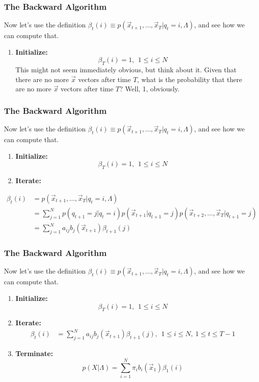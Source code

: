 \documentclass{beamer}
\begin{document}
\begin{frame}
  \frametitle{The Backward Algorithm}

  Now let's use the definition
  $\beta_t(i)\equiv p(\vec{x}_{t+1},\ldots,\vec{x}_T|q_t=i,\Lambda)$, and see how we can
  compute that.
  \begin{enumerate}
  \item {\bf Initialize:}
    \[
    \beta_T(i) = 1,~~1\le i\le N
    \]
    This might not seem immediately obvious, but think about it.
    Given that there are no more $\vec{x}$ vectors after time $T$,
    what is the probability that there are no more $\vec{x}$ vectors
    after time $T$?  Well, 1, obviously.
  \end{enumerate}
\end{frame}

\begin{frame}
  \frametitle{The Backward Algorithm}

  Now let's use the definition $\beta_t(i) \equiv
  p(\vec{x}_{t+1},\ldots,\vec{x}_T|q_t=i,\Lambda)$, and see how we can
  compute that.
  \begin{enumerate}
  \item {\bf Initialize:}
    \[
    \beta_T(i) = 1,~~1\le i\le N
    \]
  \item {\bf Iterate:}
  \end{enumerate}
  \begin{align*}
    \beta_{t}(i) &= p(\vec{x}_{t+1},\ldots,\vec{x}_T|q_t=i,\Lambda)\\
    &= \sum_{j=1}^N p(q_{t+1}=j|q_t=i)p(\vec{x}_{t+1}|q_{t+1}=j)p(\vec{x}_{t+2},\ldots,\vec{x}_T|q_{t+1}=j)\\
    &= \sum_{j=1}^N a_{ij}b_j(\vec{x}_{t+1})\beta_{t+1}(j)
  \end{align*}
\end{frame}

\begin{frame}
  \frametitle{The Backward Algorithm}

  Now let's use the definition $\beta_t(i) \equiv
  p(\vec{x}_{t+1},\ldots,\vec{x}_T|q_t=i,\Lambda)$, and see how we can
  compute that.
  \begin{enumerate}
  \item {\bf Initialize:}
    \[
    \beta_T(i) = 1,~~1\le i\le N
    \]
  \item {\bf Iterate:}
    \begin{align*}
      \beta_{t}(i) &= \sum_{j=1}^N a_{ij}b_j(\vec{x}_{t+1})\beta_{t+1}(j),~~1\le i\le N,~1\le t\le T-1
    \end{align*}
  \item {\bf Terminate:}
    \[
    p(X|\Lambda) = \sum_{i=1}^N \pi_ib_i(\vec{x}_1)\beta_1(i)
    \]
  \end{enumerate}
\end{frame}
\end{document}
